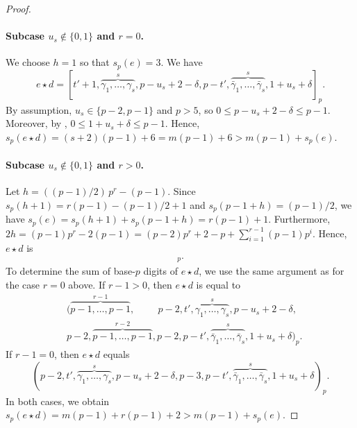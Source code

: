 \documentclass[12pt]{article}
\newcommand{\comp}[1]{\bar{#1}}
\newcommand{\wt}{s_p}
\begin{document}
\begin{proof}
\paragraph{Subcase $u_s \notin \{0,1\}$ and $r=0$.} We choose $h = 1$ so that $\wt(e) = 3$. We have
\begin{equation}
\label{eq:fail_p5}
e \star d = [t'+1,\overbrace{\gamma_1,\dots,\gamma_s}^s, p-u_s+2-\delta, p-t', \overbrace{\comp{\gamma}_1,\dots,\comp{\gamma}_s}^s,1+u_s+\delta]_p.
\end{equation}
By assumption, $u_s \in \{p-2,p-1\}$ and $p>5$, so $0 \leq p-u_s+2 - \delta \leq p-1$.  Moreover, by , $0 \leq 1+u_s + \delta \leq p-1$. Hence, $\wt(e \star d) = (s+2)(p-1)+6 = m(p-1)+6 > m(p - 1) + \wt(e)$.

\paragraph{Subcase $u_s \notin \{0,1\}$ and $r>0$.}
Let $h = ((p - 1)/2)\,p^r - (p - 1)$. 
Since $\wt(h + 1) = r(p - 1) - (p - 1) / 2 + 1$ and $\wt(p - 1 + h) = (p - 1)/2$, we have $\wt(e) = \wt(h+1) + \wt(p-1+h) = r(p-1) + 1$. Furthermore, $2h = (p - 1) p^r - 2(p - 1) = (p-2)p^r + 2 - p + \sum_{i=1}^{r-1}(p-1)p^i$. Hence, $e \star d$ is
\begin{align*}
[&\overbrace{p-1,\dots,p-1}^{r-1},p-2,\hphantom{p-}\;\,t',\overbrace{\gamma_1,\dots,\gamma_s}^s,2-u_s-\delta, \\ 
&\overbrace{p-1,\dots,p-1}^{r-1},p-2,p-t', \overbrace{\comp{\gamma}_1,\dots,\comp{\gamma}_s}^s,1+u_s+\delta]_p.
\end{align*}
To determine the sum of base-$p$ digits of $e\star d$, we use the same argument as for the case $r=0$ above. If $r-1 > 0$, then $e \star d$ is equal to
\begin{align*}
&(\overbrace{p-1,\dots,p-1}^{r-1},\;\;\;\;\;\;\;\;\,p-2,t',\overbrace{\gamma_1,\dots,\gamma_s}^s, p-u_s+2-\delta,\\ 
&p-2,\overbrace{p-1,\dots,p-1}^{r-2},p-2,p-t', \overbrace{\comp{\gamma}_1,\dots,\comp{\gamma}_s}^s,1+u_s+\delta)_p.
\end{align*}
If $r-1 = 0$, then $e \star d$ equals
\begin{equation*}
(p-2,t',\overbrace{\gamma_1,\dots,\gamma_s}^s,p-u_s+2-\delta, p-3,p-t', \overbrace{\comp{\gamma}_1,\dots,\comp{\gamma}_s}^s,1+u_s+\delta)_p.
\end{equation*}
In both cases, we obtain $\wt(e\star d) = m(p-1) + r(p-1)+2 > m(p - 1) + \wt(e)$. 


\end{proof}
\end{document}
